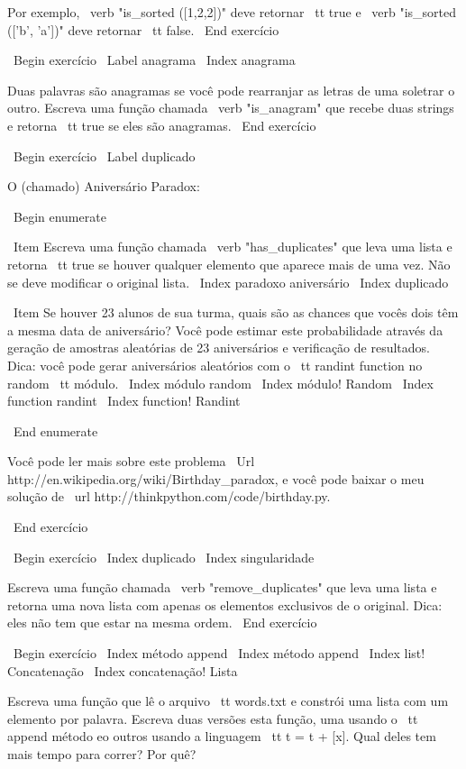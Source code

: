 \documentclass[10pt]{book}
\begin{document}
\begin {itemize}
{{{{{{{Por exemplo, \ verb "is_sorted ([1,2,2])" deve retornar {\ tt true}
e \ verb "is_sorted (['b', 'a'])" deve retornar {\ tt false}.
\ End {} exercício


\ Begin {} exercício
\ Label {} anagrama
\ Index {} anagrama

Duas palavras são anagramas se você pode rearranjar as letras de uma
soletrar o outro. Escreva uma função chamada \ verb "is_anagram"
que recebe duas strings e retorna {\ tt true} se eles são anagramas.
\ End {} exercício


\ Begin {} exercício
\ Label {} duplicado

O (chamado) Aniversário Paradox:

\ Begin {enumerate}

\ Item Escreva uma função chamada \ verb "has_duplicates" que leva
uma lista e retorna {\ tt true} se houver qualquer elemento que
aparece mais de uma vez. Não se deve modificar o original
lista.
\ Index {paradoxo aniversário}
\ Index {} duplicado

\ Item Se houver 23 alunos de sua turma, quais são as chances
que vocês dois têm a mesma data de aniversário? Você pode estimar este
probabilidade através da geração de amostras aleatórias de 23 aniversários
e verificação de resultados. Dica: você pode gerar aniversários aleatórios
com o {\ tt randint} function no {random \ tt} módulo.
\ Index {módulo random}
\ Index {módulo! Random}
\ Index {function randint}
\ Index {function! Randint}

\ End {enumerate}

Você pode ler mais sobre este problema
\ Url {http://en.wikipedia.org/wiki/Birthday_paradox}, e você pode baixar o meu
solução de \ url {http://thinkpython.com/code/birthday.py}.

\ End {} exercício


\ Begin {} exercício
\ Index {} duplicado
\ Index {} singularidade

Escreva uma função chamada \ verb "remove_duplicates" que leva
uma lista e retorna uma nova lista com apenas os elementos exclusivos de
o original. Dica: eles não tem que estar na mesma ordem.
\ End {} exercício


\ Begin {} exercício
\ Index {método append}
\ Index {método append}
\ Index {list! Concatenação}
\ Index {concatenação! Lista}

Escreva uma função que lê o arquivo {\ tt words.txt} e constrói
uma lista com um elemento por palavra. Escreva duas versões
esta função, uma usando o {\ tt} append método eo
outros usando a linguagem {\ tt t = t + [x]}. Qual deles tem
mais tempo para correr? Por quê?

}}}}}}}
\end{itemize}
\end{document}
